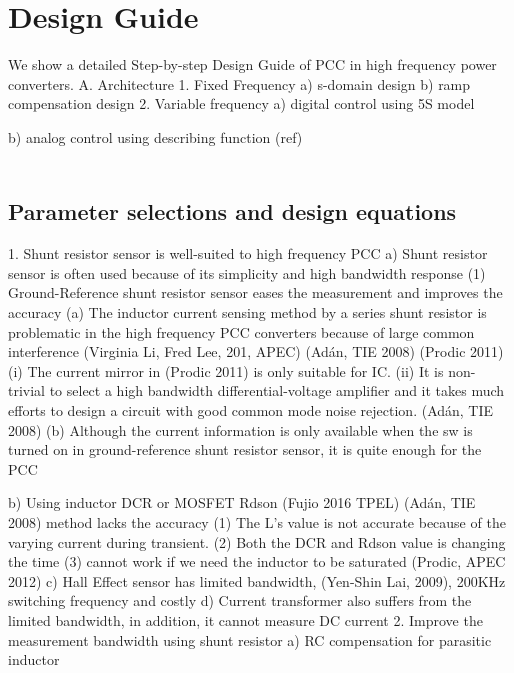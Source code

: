 \section{Design Guide} \label{designguide}
We show a detailed Step-by-step Design Guide of PCC in high frequency power converters. 
A.	Architecture
1.	Fixed Frequency 
a)	s-domain design
b)	ramp compensation design
2.	Variable frequency 
a)	digital control using 5S model

b)	analog control using describing function (ref)

\begin{align}
    
\end{align}

\subsection{Parameter selections and design equations}
1.	Shunt resistor sensor is well-suited to high frequency PCC
a)	Shunt resistor sensor is often used because of its simplicity and high bandwidth response
(1)	Ground-Reference shunt resistor sensor eases the measurement and improves the accuracy
(a)	The inductor current sensing method by a series shunt resistor is problematic in the high frequency PCC converters because of large common interference (Virginia Li, Fred Lee, 201, APEC) (Adán, TIE 2008) (Prodic 2011)
(i)	The current mirror in (Prodic 2011) is only suitable for IC.
(ii)	It is non-trivial to select a high bandwidth differential-voltage amplifier and it takes much efforts to design a circuit with good common mode noise rejection. (Adán, TIE 2008)
(b)	Although the current information is only available when the sw is turned on in ground-reference shunt resistor sensor, it is quite enough for the PCC

b)	Using inductor DCR or MOSFET Rdson (Fujio 2016 TPEL) (Adán, TIE 2008) method lacks the accuracy
(1)	 The L’s value is not accurate because of the varying current during transient. 
(2)	Both the DCR and Rdson value is changing the time
(3)	cannot work if we need the inductor to be saturated (Prodic, APEC 2012)
c)	Hall Effect sensor has limited bandwidth, (Yen-Shin Lai, 2009), 200KHz switching frequency and costly
d)	Current transformer also suffers from the limited bandwidth, in addition, it cannot measure DC current
2.	Improve the measurement bandwidth using shunt resistor
a)	RC compensation for parasitic inductor
 
 
 